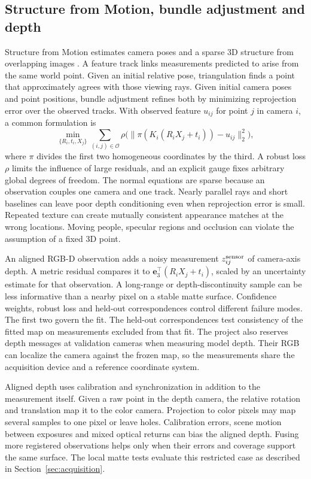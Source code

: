 \subsection{Structure from Motion, bundle adjustment and depth}
Structure from Motion estimates camera poses and a sparse 3D structure from overlapping images \cite{ref1}. A feature track links measurements predicted to arise from the same world point. Given an initial relative pose, triangulation finds a point that approximately agrees with those viewing rays. Given initial camera poses and point positions, bundle adjustment refines both by minimizing reprojection error over the observed tracks. With observed feature $u_{ij}$ for point $j$ in camera $i$, a common formulation is
\begin{equation}
  \min_{\{R_i,t_i,X_j\}}\sum_{(i,j)\in\mathcal O}
        \rho\bigl(\|\pi(K_i(R_iX_j+t_i))-u_{ij}\|_2^2\bigr),
  \label{eq:ba}
\end{equation}
where $\pi$ divides the first two homogeneous coordinates by the third. A robust loss $\rho$ limits the influence of large residuals, and an explicit gauge fixes arbitrary global degrees of freedom. The normal equations are sparse because an observation couples one camera and one track. Nearly parallel rays and short baselines can leave poor depth conditioning even when reprojection error is small. Repeated texture can create mutually consistent appearance matches at the wrong locations. Moving people, specular regions and occlusion can violate the assumption of a fixed 3D point.

An aligned RGB-D observation adds a noisy measurement $z_{ij}^{\rm sensor}$ of camera-axis depth. A metric residual compares it to $\mathbf e_3^\top(R_iX_j+t_i)$, scaled by an uncertainty estimate for that observation. A long-range or depth-discontinuity sample can be less informative than a nearby pixel on a stable matte surface. Confidence weights, robust loss and held-out correspondences control different failure modes. The first two govern the fit. The held-out correspondences test consistency of the fitted map on measurements excluded from that fit. The project also reserves depth messages at validation cameras when measuring model depth. Their RGB can localize the camera against the frozen map, so the measurements share the acquisition device and a reference coordinate system.

Aligned depth uses calibration and synchronization in addition to the measurement itself. Given a raw point in the depth camera, the relative rotation and translation map it to the color camera. Projection to color pixels may map several samples to one pixel or leave holes. Calibration errors, scene motion between exposures and mixed optical returns can bias the aligned depth. Fusing more registered observations helps only when their errors and coverage support the same surface. The local matte tests evaluate this restricted case as described in Section~\ref{sec:acquisition}.

